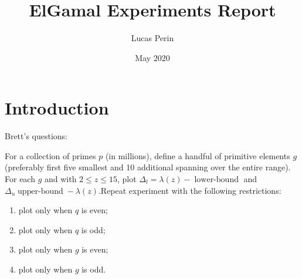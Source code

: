 \documentclass{article}
\title{ElGamal Experiments Report}
\author{Lucas Perin}
\date{May 2020}
\begin{document}
\maketitle

\section{Introduction}

Brett's questions:


For a collection of primes $p$ (in millions), define a handful of primitive elements $g$ (preferably first five smallest and  10 additional spanning over the entire range). For each $g$ and with $2 \leq z \leq 15$, plot $\Delta_l = \lambda(z) - \operatorname{lower-bound}$ and $\Delta_u \operatorname{upper-bound} - \lambda(z)$.Repeat experiment with the following restrictions:

\begin{enumerate}
    \item plot only when $q$ is even;
    \item plot only when $q$ is odd;
    \item plot only when $g$ is even;
    \item plot only when $g$ is odd.
\end{enumerate}
\end{document}
